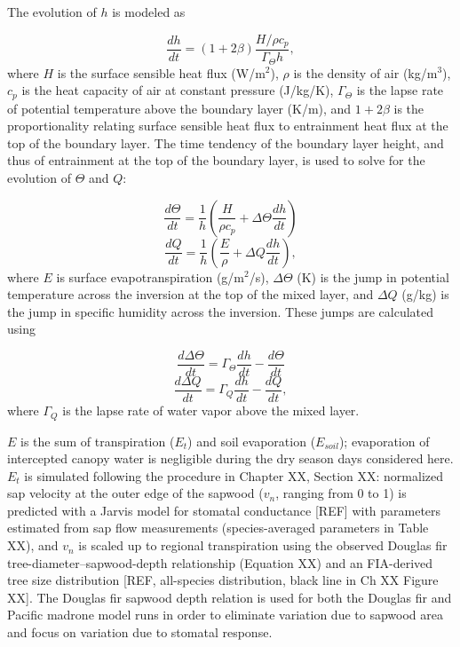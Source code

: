 The evolution of $h$ is modeled as

\begin{equation}
\frac{dh}{dt} = (1+2\beta)\frac{H/\rho c_p}{\Gamma_\Theta h},
\end{equation}
where $H$ is the surface sensible heat flux (W/m$^2$), $\rho$ is the density of air (kg/m$^3$), $c_p$ is the heat capacity of air at constant pressure (J/kg/K), $\Gamma_\Theta$ is the lapse rate of potential temperature above the boundary layer (K/m), and $1+2\beta$ is the proportionality relating surface sensible heat flux to entrainment heat flux at the top of the boundary layer.  The time tendency of the boundary layer height, and thus of entrainment at the top of the boundary layer, is used to solve for the evolution of $\Theta$ and $Q$:

\begin{equation}
\frac{d\Theta}{dt} = \frac{1}{h}\left(\frac{H}{\rho c_p}+\Delta\Theta\frac{dh}{dt}\right)
\end{equation}
\begin{equation}
\frac{dQ}{dt} = \frac{1}{h}\left(\frac{E}{\rho}+\Delta Q \frac{dh}{dt}\right),
\end{equation}
where $E$ is surface evapotranspiration (g/m$^2$/s), $\Delta\Theta$ (K) is the jump in potential temperature across the inversion at the top of the mixed layer, and $\Delta Q$ (g/kg) is the jump in specific humidity across the inversion.  These jumps are calculated using

\begin{equation}
\frac{d\Delta\Theta}{dt} = \Gamma_\Theta\frac{dh}{dt}-\frac{d\Theta}{dt}
\end{equation}
\begin{equation}
\frac{d\Delta Q}{dt} = \Gamma_Q\frac{dh}{dt}-\frac{dQ}{dt},
\end{equation}
where $\Gamma_Q$ is the lapse rate of water vapor above the mixed layer.

$E$ is the sum of transpiration ($E_t$) and soil evaporation ($E_{soil}$); evaporation of intercepted canopy water is negligible during the dry season days considered here.  $E_t$ is simulated following the procedure in Chapter XX, Section XX: normalized sap velocity at the outer edge of the sapwood ($v_n$, ranging from 0 to 1) is predicted with a Jarvis model for stomatal conductance [REF] with parameters estimated from sap flow measurements (species-averaged parameters in Table XX), and $v_n$ is scaled up to regional transpiration using the observed Douglas fir tree-diameter--sapwood-depth relationship (Equation XX) and an FIA-derived tree size distribution [REF, all-species distribution, black line in Ch XX Figure XX].  The Douglas fir sapwood depth relation is used for both the Douglas fir and Pacific madrone model runs in order to eliminate variation due to sapwood area and focus on variation due to stomatal response.

